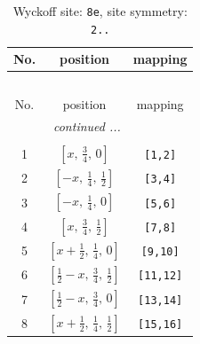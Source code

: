 \documentclass[fleqn,8pt]{jsarticle}
\begin{document}
\renewcommand{\arraystretch}{1.2}
\begin{longtable}{ccc}
\caption{Wyckoff site: {\tt 8e}, site symmetry: {\tt 2..}}
 \\
 \hline \hline
No. & position & mapping \\ \hline \endfirsthead

\multicolumn{2}{l}{\tablename\ \thetable{}} \\
 \hline \hline
No. & position & mapping \\ \hline \endhead

 \hline \hline
\multicolumn{2}{r}{\footnotesize\it continued ...} \\ \endfoot

 \hline \hline
\multicolumn{2}{r}{} \\ \endlastfoot

1 & $\left[ x,\, \frac{3}{4},\, 0 \right]$ & {\tt [1,2]} \\ \hline
2 & $\left[ - x,\, \frac{1}{4},\, \frac{1}{2} \right]$ & {\tt [3,4]} \\ \hline
3 & $\left[ - x,\, \frac{1}{4},\, 0 \right]$ & {\tt [5,6]} \\ \hline
4 & $\left[ x,\, \frac{3}{4},\, \frac{1}{2} \right]$ & {\tt [7,8]} \\ \hline
5 & $\left[ x + \frac{1}{2},\, \frac{1}{4},\, 0 \right]$ & {\tt [9,10]} \\ \hline
6 & $\left[ \frac{1}{2} - x,\, \frac{3}{4},\, \frac{1}{2} \right]$ & {\tt [11,12]} \\ \hline
7 & $\left[ \frac{1}{2} - x,\, \frac{3}{4},\, 0 \right]$ & {\tt [13,14]} \\ \hline
8 & $\left[ x + \frac{1}{2},\, \frac{1}{4},\, \frac{1}{2} \right]$ & {\tt [15,16]} \\
\end{longtable}
\renewcommand{\arraystretch}{1.2}
\end{document}
